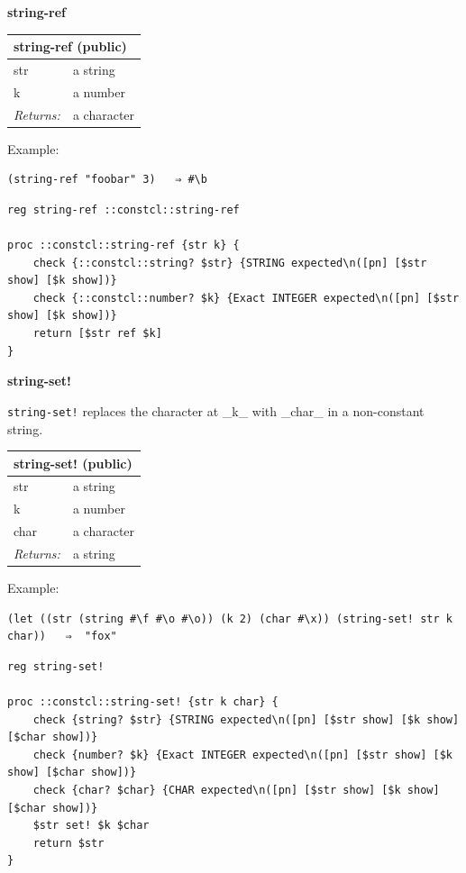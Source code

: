 \documentclass[twoside,9pt]{report}
\begin{document}
\textbf{string-ref}

\begin{tabular}{ |l l| }
\hline
\multicolumn{2}{|l|}{string-ref (public)} \\
\hline
str & a string \\
k & a number \\
\textit{Returns:} & a character \\
\hline
\end{tabular}


Example:

\noindent\makebox[\linewidth]{\rule{\linewidth}{0.4pt}}
\begin{lstlisting}
(string-ref "foobar" 3)   ⇒ #\b
\end{lstlisting}
\noindent\makebox[\linewidth]{\rule{\linewidth}{0.4pt}}
\noindent\makebox[\linewidth]{\rule{\linewidth}{0.4pt}}
\begin{lstlisting}
reg string-ref ::constcl::string-ref
 
proc ::constcl::string-ref {str k} {
    check {::constcl::string? $str} {STRING expected\n([pn] [$str show] [$k show])}
    check {::constcl::number? $k} {Exact INTEGER expected\n([pn] [$str show] [$k show])}
    return [$str ref $k]
}
\end{lstlisting}
\noindent\makebox[\linewidth]{\rule{\linewidth}{0.4pt}}

\textbf{string-set!}


\texttt{string-set!} replaces the character at \_k\_ with \_char\_ in a non-constant string.

\begin{tabular}{ |l l| }
\hline
\multicolumn{2}{|l|}{string-set! (public)} \\
\hline
str & a string \\
k & a number \\
char & a character \\
\textit{Returns:} & a string \\
\hline
\end{tabular}


Example:

\noindent\makebox[\linewidth]{\rule{\linewidth}{0.4pt}}
\begin{lstlisting}
(let ((str (string #\f #\o #\o)) (k 2) (char #\x)) (string-set! str k char))   ⇒  "fox"
\end{lstlisting}
\noindent\makebox[\linewidth]{\rule{\linewidth}{0.4pt}}
\noindent\makebox[\linewidth]{\rule{\linewidth}{0.4pt}}
\begin{lstlisting}
reg string-set!
 
proc ::constcl::string-set! {str k char} {
    check {string? $str} {STRING expected\n([pn] [$str show] [$k show] [$char show])}
    check {number? $k} {Exact INTEGER expected\n([pn] [$str show] [$k show] [$char show])}
    check {char? $char} {CHAR expected\n([pn] [$str show] [$k show] [$char show])}
    $str set! $k $char
    return $str
}
\end{lstlisting}
\noindent\makebox[\linewidth]{\rule{\linewidth}{0.4pt}}
\end{document}
